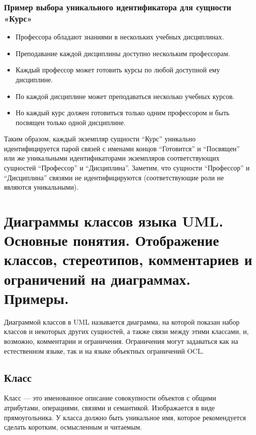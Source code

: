 \documentclass[a4paper,12pt]{article}
\begin{document}
\subsubsection{Пример выбора уникального идентификатора для сущности «Курс»}

\begin{itemize}
    \item Профессора обладают знаниями в нескольких учебных дисциплинах.
    \item Преподавание каждой дисциплины доступно нескольким профессорам.
    \item Каждый профессор может готовить курсы по любой доступной ему дисциплине.
    \item По каждой дисциплине может преподаваться несколько учебных курсов.
    \item Но каждый курс должен готовиться только одним профессором и быть посвящен только одной дисциплине.
\end{itemize}

Таким образом, каждый экземпляр сущности ``Курс'' уникально идентифицируется парой связей с именами концов ``Готовится'' и ``Посвящен'' или же уникальными идентификаторами экземпляров соответствующих сущностей ``Профессор'' и ``Дисциплина''. Заметим, что сущности ``Профессор'' и ``Дисциплина'' связями не идентифицируются (соответствующие роли не являются уникальными).

\section{Диаграммы классов языка UML. Основные понятия. Отображение классов, стереотипов, комментариев и ограничений на диаграммах. Примеры.}

Диаграммой классов в UML называется диаграмма, на которой показан набор классов и некоторых других сущностей, а также связи между этими классами, и, возможно, комментарии и ограничения. Ограничения могут задаваться как на естественном языке, так и на языке объектных ограничений OCL.

\subsection{Класс}

Класс — это именованное описание совокупности объектов с общими атрибутами, операциями, связями и семантикой. Изображается в виде прямоугольника. У класса должно быть уникальное имя, которое рекомендуется сделать коротким, осмысленным и читаемым.
\end{document}
